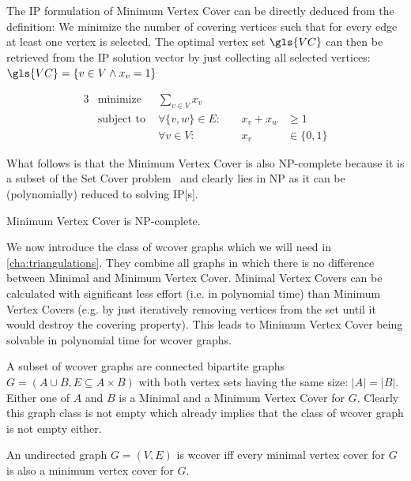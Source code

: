 The \gls{IP} formulation of Minimum Vertex Cover can be directly
deduced from the definition: We minimize the number of covering
vertices such that for every edge at least one vertex is selected. The
optimal vertex set \(\gls{VC}\) can then be retrieved from the
\gls{IP} solution vector by just collecting all selected vertices:
\( \gls{VC} = \{v \in V \land x_v = 1\} \)

\begin{problem}
  \begin{alignat*}{3}
    &\text{minimize } & \sum\limits_{v \in V} x_v \\
    &\text{subject to } & \forall \{v,w\} \in E : &~& x_v + x_w &\geq 1 \\
    && \forall v \in V : &~& x_v &\in \{0,1\}
  \end{alignat*}
\end{problem}

What follows is that the Minimum Vertex Cover is also NP-complete
because it is a subset of the Set Cover
problem~\cite{karp_np_complete} and clearly lies in NP as it can be
(polynomially) reduced to solving \gls{IP}[s].

\begin{theorem}
  \label{thm:minimum_vertex_cover_complexity}
  Minimum Vertex Cover is NP-complete.~\cite{karp_np_complete}
\end{theorem}

We now introduce the class of \gls{wcover} graphs which we will need
in \cref{cha:triangulations}. They combine all graphs in which there
is no difference between Minimal and Minimum Vertex Cover. Minimal
Vertex Covers can be calculated with significant less effort (i.e. 
in polynomial time) than Minimum Vertex Covers (e.g. by just
iteratively removing vertices from the set until it would destroy the
covering property). This leads to Minimum Vertex Cover being solvable
in polynomial time for \gls{wcover} graphs.

A subset of \gls{wcover} graphs are connected bipartite graphs
\(G=(A \cup B,E \subseteq A \times B)\) with both vertex sets having
the same size: \(|A|=|B|\). Either one of \(A\) and \(B\) is a Minimal
and a Minimum Vertex Cover for \(G\). Clearly this graph class is not
empty which already implies that the class of \gls{wcover} graph is
not empty either.

\begin{definition}
  \label{def:well_covered}
  An undirected graph \(G=(V,E)\) is \gls{wcover} iff every minimal
  vertex cover for \(G\) is also a minimum vertex cover for \(G\).
  \cite{graph_well_covered}
\end{definition}

